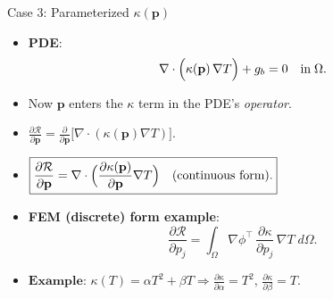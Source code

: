 \documentclass[10pt,aspectratio=169]{beamer}
\begin{document}
\begin{frame}{Case 3: Parameterized \(\kappa(\mathbf{p})\)}
\small
\begin{itemize}
    \item \textbf{PDE}:
      \[
        \nabla \cdot \Bigl(\kappa(\mathbf{p})\,\nabla T\Bigr)
        + g_b = 0
        \quad\text{in}\;\Omega.
      \]
    \item Now \(\mathbf{p}\) enters the \(\kappa\) term in the PDE’s \textit{operator}.
    \item \(\displaystyle
      \frac{\partial \mathcal{R}}{\partial \mathbf{p}}
      = 
      \frac{\partial}{\partial \mathbf{p}}
      \bigl[\nabla\cdot(\kappa(\mathbf{p})\nabla T)\bigr].
      \)
    \item \(\boxed{\frac{\partial \mathcal{R}}{\partial \mathbf{p}}
           = \nabla \cdot \Bigl(\frac{\partial \kappa(\mathbf{p})}{\partial \mathbf{p}}\nabla T\Bigr)
           \quad\text{(continuous form)}.}\)

    \item \textbf{FEM (discrete) form example}:
      \[
        \frac{\partial \mathcal{R}}{\partial p_j}
        =
        \int_{\Omega}
          \nabla \phi^\top
          \,\frac{\partial \kappa}{\partial p_j}
          \,\nabla T
        \; d\Omega.
      \]
    \item \(\textbf{Example: } 
       \kappa(T) = \alpha T^2 + \beta T 
       \Rightarrow
       \frac{\partial \kappa}{\partial \alpha} = T^2,\,
       \frac{\partial \kappa}{\partial \beta} = T.
    \)
\end{itemize}
\end{frame}

\end{document}
